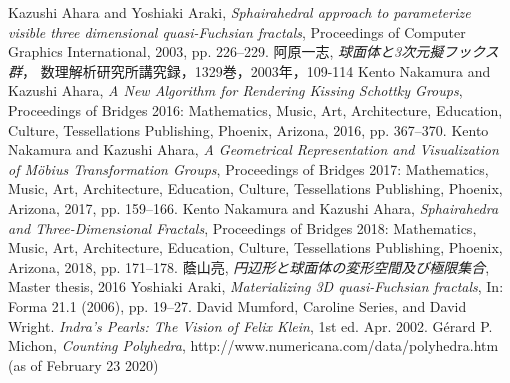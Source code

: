 \documentclass[suppldata, dvipdfmx]{interact}
\theoremstyle{plain}%
\theoremstyle{definition}
\theoremstyle{remark}
\theoremstyle{problemstyle}
\begin{document}
\begin{thebibliography}{99}
        Kazushi Ahara and Yoshiaki Araki,
        \emph{Sphairahedral approach to parameterize visible three
        dimensional quasi-Fuchsian fractals},
        Proceedings of Computer Graphics International, 2003,
        pp. 226--229.
        阿原一志, \emph{球面体と3次元擬フックス群}，
        数理解析研究所講究録，1329巻，2003年，109-114
        Kento Nakamura and Kazushi Ahara,
        \emph{A New Algorithm for Rendering Kissing Schottky Groups}, 
        Proceedings of Bridges 2016: Mathematics, Music, Art, Architecture,
        Education, Culture, Tessellations Publishing,
        Phoenix, Arizona, 2016, pp. 367--370.
        Kento Nakamura and Kazushi Ahara,
        \emph{A Geometrical Representation and Visualization of M\"{o}bius Transformation Groups}, 
        Proceedings of Bridges 2017: Mathematics, Music, Art, Architecture,
        Education, Culture, Tessellations Publishing,
        Phoenix, Arizona, 2017, pp. 159--166.
        Kento Nakamura and Kazushi Ahara,
        \emph{Sphairahedra and Three-Dimensional Fractals}, 
        Proceedings of Bridges 2018: Mathematics, Music, Art, Architecture,
        Education, Culture, Tessellations Publishing,
        Phoenix, Arizona, 2018, pp. 171--178.
        蔭山亮, 
        \emph{円辺形と球面体の変形空間及び極限集合},
        Master thesis, 2016
        Yoshiaki Araki,
        \emph{Materializing 3D quasi-Fuchsian fractals},
        In: Forma 21.1 (2006), pp. 19–27.
        David Mumford, Caroline Series, and David Wright.
        \emph{Indra’s Pearls: The Vision of Felix Klein},
        1st ed. Apr. 2002.
        G\'erard P. Michon, 
        \emph{Counting Polyhedra},
        http://www.numericana.com/data/polyhedra.htm
        (as of February 23 2020)
\end{thebibliography}
\end{document}
